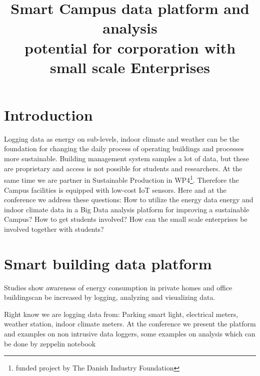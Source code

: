 \documentclass[conference]{IEEEtran}
\begin{document}
\title{Smart Campus data platform and analysis \\
 \large potential for corporation with small scale Enterprises}

\author{
}
\maketitle

\section{Introduction}
Logging  data as energy on sub-levels, indoor climate and weather can be the foundation for changing the daily process of operating buildings and processes more sustainable. Building management system samples a lot of data, but these are proprietary and access is not possible for students and researchers. At the same time we are partner in Sustainable Production in WP4\footnote{funded project by The Danish Industry Foundation}. Therefore the Campus facilities is equipped with low-cost IoT sensors. Here and at the conference we address these questions: How to utilize the energy data energy and indoor climate data in a Big Data analysis platform for improving a sustainable Campus?  How to get students involved? How can the small scale enterprises be involved together with students?

\section{Smart building data platform}
Studies show awareness of energy consumption in private homes\cite{Ali2013VisualizationHomes} and office buildings\cite{Katzeff2013ExploringConsumption}can be increased by logging, analyzing and visualizing data.\par Right know we are logging data from: Parking smart light, electrical meters, weather station, indoor climate meters. At the conference we present the platform and examples on non intrusive data loggers, some examples on analysis which can be done by zeppelin notebook\cite{zep}\cite{BigWipro1}\cite{DubyREPRODUCIBLENOTEBOOK1} 
\end{document}
